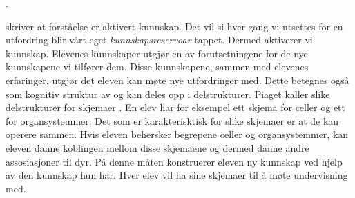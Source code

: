 \documentclass[main.tex]{subfiles}
\begin{document}
.



 skriver at forståelse er aktivert kunnskap. Det vil si hver gang vi utsettes for en utfordring blir vårt eget \emph{kunnskapsreservoar}
tappet. Dermed aktiverer vi kunnskap. Elevenes kunnskaper utgjør en av forutsetningene for de nye kunnskapene vi tilfører dem. Disse kunnskapene, sammen med
elevenes erfaringer, utgjør det eleven kan møte nye utfordringer med. Dette betegnes også som kognitiv struktur av \citeauthor{solv92} og kan deles opp i 
delstrukturer. Piaget kaller slike delstrukturer for skjemaer . En elev har for eksempel ett skjema for celler og ett for organsystemmer. 
Det som er karakterisktisk for slike skjemaer er at de kan operere sammen. Hvis eleven behersker begrepene celler og organsystemmer, kan eleven danne koblingen
mellom disse skjemaene og dermed danne andre assosiasjoner til dyr. På denne måten konstruerer eleven ny kunnskap ved hjelp av den kunnskap hun har.
Hver elev vil ha sine skjemaer til å møte undervisning med.



\end{document}

